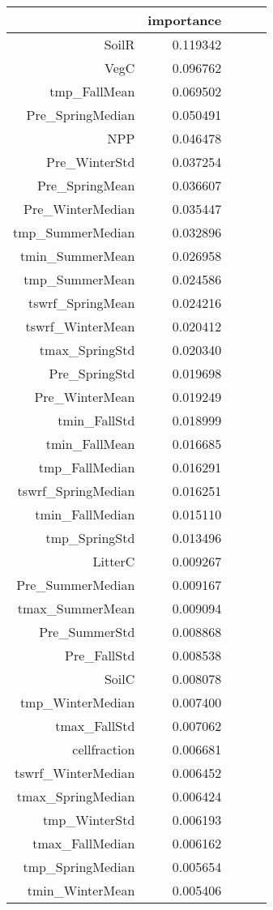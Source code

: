 \begin{tabular}{rrrrr}
\toprule
 & importance \\
\midrule
SoilR & 0.119342 \\
VegC & 0.096762 \\
tmp_FallMean & 0.069502 \\
Pre_SpringMedian & 0.050491 \\
NPP & 0.046478 \\
Pre_WinterStd & 0.037254 \\
Pre_SpringMean & 0.036607 \\
Pre_WinterMedian & 0.035447 \\
tmp_SummerMedian & 0.032896 \\
tmin_SummerMean & 0.026958 \\
tmp_SummerMean & 0.024586 \\
tswrf_SpringMean & 0.024216 \\
tswrf_WinterMean & 0.020412 \\
tmax_SpringStd & 0.020340 \\
Pre_SpringStd & 0.019698 \\
Pre_WinterMean & 0.019249 \\
tmin_FallStd & 0.018999 \\
tmin_FallMean & 0.016685 \\
tmp_FallMedian & 0.016291 \\
tswrf_SpringMedian & 0.016251 \\
tmin_FallMedian & 0.015110 \\
tmp_SpringStd & 0.013496 \\
LitterC & 0.009267 \\
Pre_SummerMedian & 0.009167 \\
tmax_SummerMean & 0.009094 \\
Pre_SummerStd & 0.008868 \\
Pre_FallStd & 0.008538 \\
SoilC & 0.008078 \\
tmp_WinterMedian & 0.007400 \\
tmax_FallStd & 0.007062 \\
cellfraction & 0.006681 \\
tswrf_WinterMedian & 0.006452 \\
tmax_SpringMedian & 0.006424 \\
tmp_WinterStd & 0.006193 \\
tmax_FallMedian & 0.006162 \\
tmp_SpringMedian & 0.005654 \\
tmin_WinterMean & 0.005406 \\

\end{tabular}
